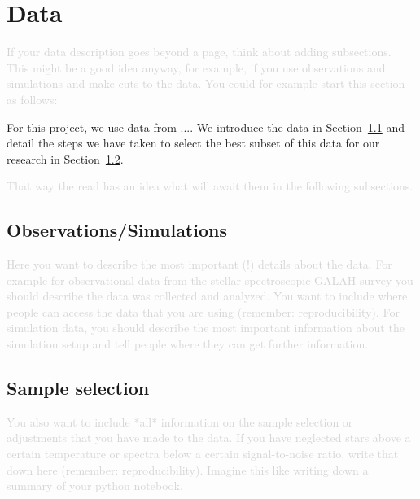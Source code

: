 \documentclass[fleqn,usenatbib]{mnras}
\newcommand{\comment}[1]{\textcolor{lightgray}{#1}}
\begin{document}
\clearpage
\section{Data} \label{sec:data}

\comment{If your data description goes beyond a page, think about adding subsections. This might be a good idea anyway, for example, if you use observations and simulations and make cuts to the data. You could for example start this section as follows:}

For this project, we use data from .... We introduce the data in Section~\ref{sec:data_observations} and detail the steps we have taken to select the best subset of this data for our research in Section~\ref{sec:data_selection}.

\comment{That way the read has an idea what will await them in the following subsections.}

\subsection{Observations/Simulations} \label{sec:data_observations}

\comment{Here you want to describe the most important (!) details about the data. For example for observational data from the stellar spectroscopic GALAH survey \citep{Buder2018, Buder2021, Buder2024b} you should describe the data was collected and analyzed. You want to include where people can access the data that you are using (remember: reproducibility). For simulation data, you should describe the most important information about the simulation setup and tell people where they can get further information.}

\subsection{Sample selection} \label{sec:data_selection}

\comment{You also want to include *all* information on the sample selection or adjustments that you have made to the data. If you have neglected stars above a certain temperature or spectra below a certain signal-to-noise ratio, write that down here (remember: reproducibility). Imagine this like writing down a summary of your python notebook.}

\clearpage
\end{document}
